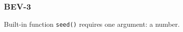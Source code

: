 \subsubsection{BEV-3}\label{sec:error_code_bev_3}

Built-in function \texttt{seed()} requires one argument: a number.


